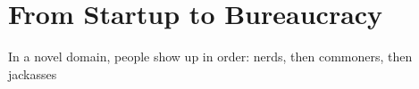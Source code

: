 \section{From Startup to Bureaucracy}

In a novel domain, people show up in order: nerds, then commoners, then jackasses
